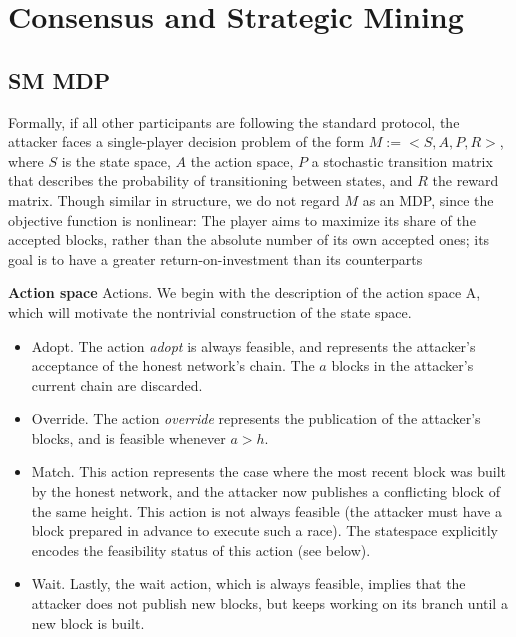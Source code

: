 \section{Consensus and Strategic Mining}

\subsection{SM MDP}

Formally, if all other participants are following the standard protocol, the attacker faces a single-player decision problem of the form $M := <S, A, P, R>$, where $S$ is the state space, $A$ the action space, $P$ a stochastic transition matrix that describes the probability of transitioning between states, and $R$ the reward matrix. Though similar in structure, we do not regard $M$ as an MDP, since the objective function is nonlinear: The player aims to maximize its share of the accepted blocks, rather than the absolute number of its own accepted ones; its goal is to have a greater return-on-investment than its counterparts

\textbf{Action space}
Actions. We begin with the description of the action space A, which will motivate the nontrivial construction of the state space.
\begin{itemize}
    \item Adopt. The action \emph{adopt} is always feasible, and represents the attacker’s acceptance of the honest network’s chain. The $a$ blocks in the attacker’s current chain are discarded.
    \item Override. The action \emph{override} represents the publication of the attacker’s blocks, and is feasible whenever $a > h$.
    \item Match. This action represents the case where the most recent block was built by the honest network, and the attacker now publishes a conflicting block of the same height. This action is not always feasible (the attacker must have a block prepared in advance to execute such a race). The statespace explicitly encodes the feasibility status of this action (see below).
    \item Wait. Lastly, the wait action, which is always feasible, implies that the attacker does not publish new blocks, but keeps working on its branch until a new block is built.
\end{itemize}

